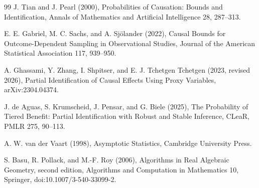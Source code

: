 \documentclass{article}
\begin{document}
\begin{thebibliography}{99}
   J. Tian and J. Pearl (2000), Probabilities of Causation: Bounds and Identification, Annals of Mathematics and Artificial Intelligence 28, 287--313.

   E. E. Gabriel, M. C. Sachs, and A. Sjölander (2022), Causal Bounds for Outcome-Dependent Sampling in Observational Studies, Journal of the American Statistical Association 117, 939--950.

   A. Ghassami, Y. Zhang, I. Shpitser, and E. J. Tchetgen Tchetgen (2023, revised 2026), Partial Identification of Causal Effects Using Proxy Variables, arXiv:2304.04374.

   J. de Aguas, S. Krumscheid, J. Pensar, and G. Biele (2025), The Probability of Tiered Benefit: Partial Identification with Robust and Stable Inference, CLeaR, PMLR 275, 90--113.

   A. W. van der Vaart (1998), Asymptotic Statistics, Cambridge University Press.

   S. Basu, R. Pollack, and M.-F. Roy (2006), Algorithms in Real Algebraic Geometry, second edition, Algorithms and Computation in Mathematics 10, Springer, doi:10.1007/3-540-33099-2.

\end{thebibliography}
\end{document}
